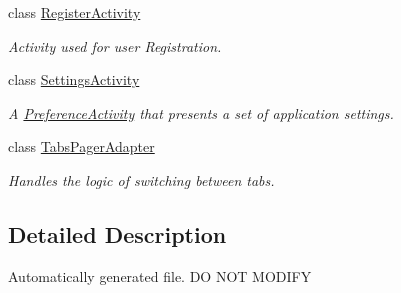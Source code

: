 \begin{DoxyCompactItemize}
class \hyperlink{classcom_1_1lakehead_1_1textbookmarket_1_1_register_activity}{Register\-Activity}
\begin{DoxyCompactList}\small\item\em Activity used for user Registration. \end{DoxyCompactList}\item 
class \hyperlink{classcom_1_1lakehead_1_1textbookmarket_1_1_settings_activity}{Settings\-Activity}
\begin{DoxyCompactList}\small\item\em A \hyperlink{}{Preference\-Activity} that presents a set of application settings. \end{DoxyCompactList}\item 
class \hyperlink{classcom_1_1lakehead_1_1textbookmarket_1_1_tabs_pager_adapter}{Tabs\-Pager\-Adapter}
\begin{DoxyCompactList}\small\item\em Handles the logic of switching between tabs. \end{DoxyCompactList}\end{DoxyCompactItemize}


\subsection{Detailed Description}
Automatically generated file. D\-O N\-O\-T M\-O\-D\-I\-F\-Y 